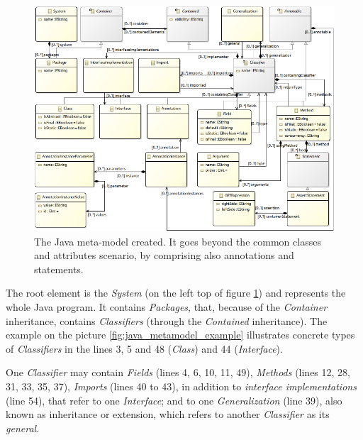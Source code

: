 \documentclass[tuberlin,cic,tc,english,noabntcite]{iiufrgs}
\begin{document}
\begin{figure}[h]
    \caption{The Java meta-model created. It goes beyond the common classes and attributes scenario, by comprising also annotations and statements.}
    \begin{center}
        \includegraphics[width=\textwidth]{javaMetamodel}
    \end{center}
    \label{fig:java_metamodel}
\end{figure}

The root element is the \emph{System} (on the left top of figure \ref{fig:java_metamodel}) and represents the whole Java program. It contains \emph{Packages}, that, because of the \emph{Container} inheritance, contains \emph{Classifiers} (through the \emph{Contained} inheritance). The example on the picture \ref{fig:java_metamodel_example} illustrates concrete types of \emph{Classifiers} in the lines 3, 5 and 48 (\emph{Class}) and 44 (\emph{Interface}).

One \emph{Classifier} may contain \emph{Fields} (lines 4, 6, 10, 11, 49), \emph{Methods} (lines 12, 28, 31, 33, 35, 37), \emph{Imports} (lines 40 to 43), in addition to \emph{interface implementations} (line 54), that refer to one \emph{Interface}; and to one \emph{Generalization} (line 39), also known as inheritance or extension, which refers to another \emph{Classifier} as its \emph{general}.
\end{document}
